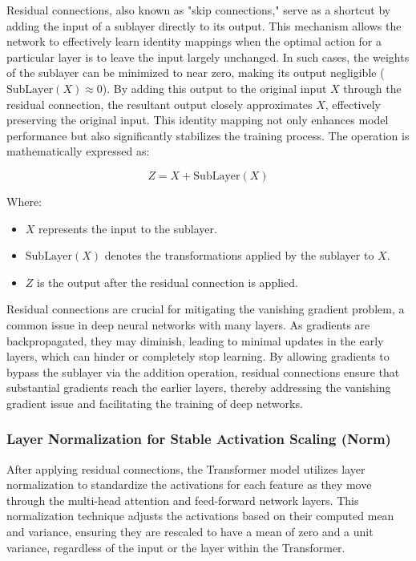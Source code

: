 Residual connections, also known as "skip connections," serve as a shortcut by adding the input of a sublayer directly to its output. This mechanism allows the network to effectively learn identity mappings when the optimal action for a particular layer is to leave the input largely unchanged. In such cases, the weights of the sublayer can be minimized to near zero, making its output negligible (\(\text{SubLayer}(X) \approx 0\)). By adding this output to the original input \(X\) through the residual connection, the resultant output closely approximates \(X\), effectively preserving the original input. This identity mapping not only enhances model performance but also significantly stabilizes the training process. The operation is mathematically expressed as:

\begin{equation}
    Z = X + \text{SubLayer}(X)
\end{equation}

Where:
\begin{itemize}
    \item \(X\) represents the input to the sublayer.
    \item \(\text{SubLayer}(X)\) denotes the transformations applied by the sublayer to \(X\).
    \item \(Z\) is the output after the residual connection is applied.
\end{itemize}

Residual connections are crucial for mitigating the vanishing gradient problem, a common issue in deep neural networks with many layers. As gradients are backpropagated, they may diminish, leading to minimal updates in the early layers, which can hinder or completely stop learning. By allowing gradients to bypass the sublayer via the addition operation, residual connections ensure that substantial gradients reach the earlier layers, thereby addressing the vanishing gradient issue and facilitating the training of deep networks.

\subsubsection{Layer Normalization for Stable Activation Scaling (Norm)}

After applying residual connections, the Transformer model utilizes layer normalization to standardize the activations for each feature as they move through the multi-head attention and feed-forward network layers. This normalization technique adjusts the activations based on their computed mean and variance, ensuring they are rescaled to have a mean of zero and a unit variance, regardless of the input or the layer within the Transformer.

